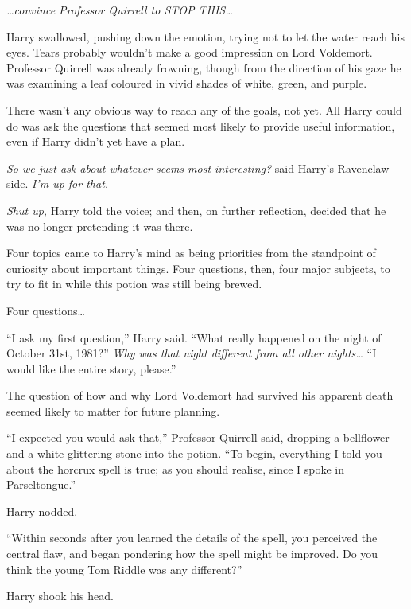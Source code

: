 \emph{…convince Professor Quirrell to STOP THIS…}

Harry swallowed, pushing down the emotion, trying not to let the water reach
his eyes. Tears probably wouldn’t make a good impression on Lord Voldemort.
Professor Quirrell was already frowning, though from the direction of his gaze
he was examining a leaf coloured in vivid shades of white, green, and purple.

There wasn’t any obvious way to reach any of the goals, not yet. All Harry
could do was ask the questions that seemed most likely to provide useful
information, even if Harry didn’t yet have a plan.

\emph{So we just ask about whatever seems most interesting?} said Harry’s
Ravenclaw side. \emph{I’m up for that.}

\emph{Shut up,} Harry told the voice; and then, on further reflection, decided
that he was no longer pretending it was there.

Four topics came to Harry’s mind as being priorities from the standpoint of
curiosity about important things. Four questions, then, four major subjects, to
try to fit in while this potion was still being brewed.

Four questions…

“I ask my first question,” Harry said. “What really happened on the night of
October 31st, 1981?” \emph{Why was that night different from all other
nights…} “I would like the entire story, please.”

The question of how and why Lord Voldemort had survived his apparent death
seemed likely to matter for future planning.

“I expected you would ask that,” Professor Quirrell said, dropping a bellflower
and a white glittering stone into the potion. “To begin, everything I told you
about the horcrux spell is true; as you should realise, since I spoke in
Parseltongue.”

Harry nodded.

“Within seconds after you learned the details of the spell, you perceived the
central flaw, and began pondering how the spell might be improved. Do you think
the young Tom Riddle was any different?”

Harry shook his head.

